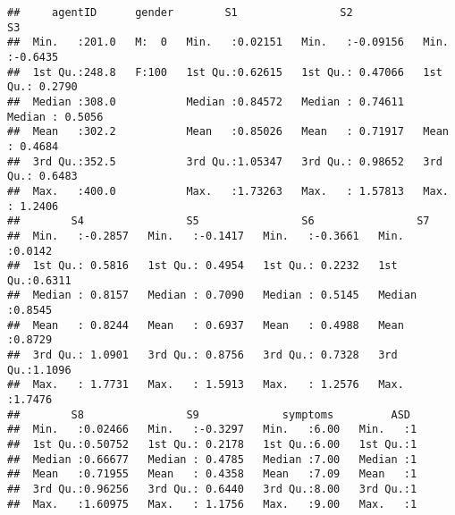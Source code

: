 \documentclass[]{article}
\newenvironment{Shaded}{\begin{snugshade}}{\end{snugshade}}
\newcommand{\KeywordTok}[1]{\textcolor[rgb]{0.13,0.29,0.53}{\textbf{#1}}}
\newcommand{\DecValTok}[1]{\textcolor[rgb]{0.00,0.00,0.81}{#1}}
\newcommand{\StringTok}[1]{\textcolor[rgb]{0.31,0.60,0.02}{#1}}
\newcommand{\CommentTok}[1]{\textcolor[rgb]{0.56,0.35,0.01}{\textit{#1}}}
\newcommand{\OperatorTok}[1]{\textcolor[rgb]{0.81,0.36,0.00}{\textbf{#1}}}
\newcommand{\NormalTok}[1]{#1}
\begin{document}
\begin{verbatim}
##     agentID      gender        S1                S2                 S3         
##  Min.   :201.0   M:  0   Min.   :0.02151   Min.   :-0.09156   Min.   :-0.6435  
##  1st Qu.:248.8   F:100   1st Qu.:0.62615   1st Qu.: 0.47066   1st Qu.: 0.2790  
##  Median :308.0           Median :0.84572   Median : 0.74611   Median : 0.5056  
##  Mean   :302.2           Mean   :0.85026   Mean   : 0.71917   Mean   : 0.4684  
##  3rd Qu.:352.5           3rd Qu.:1.05347   3rd Qu.: 0.98652   3rd Qu.: 0.6483  
##  Max.   :400.0           Max.   :1.73263   Max.   : 1.57813   Max.   : 1.2406  
##        S4                S5                S6                S7        
##  Min.   :-0.2857   Min.   :-0.1417   Min.   :-0.3661   Min.   :0.0142  
##  1st Qu.: 0.5816   1st Qu.: 0.4954   1st Qu.: 0.2232   1st Qu.:0.6311  
##  Median : 0.8157   Median : 0.7090   Median : 0.5145   Median :0.8545  
##  Mean   : 0.8244   Mean   : 0.6937   Mean   : 0.4988   Mean   :0.8729  
##  3rd Qu.: 1.0901   3rd Qu.: 0.8756   3rd Qu.: 0.7328   3rd Qu.:1.1096  
##  Max.   : 1.7731   Max.   : 1.5913   Max.   : 1.2576   Max.   :1.7476  
##        S8                S9             symptoms         ASD   
##  Min.   :0.02466   Min.   :-0.3297   Min.   :6.00   Min.   :1  
##  1st Qu.:0.50752   1st Qu.: 0.2178   1st Qu.:6.00   1st Qu.:1  
##  Median :0.66677   Median : 0.4785   Median :7.00   Median :1  
##  Mean   :0.71955   Mean   : 0.4358   Mean   :7.09   Mean   :1  
##  3rd Qu.:0.96256   3rd Qu.: 0.6440   3rd Qu.:8.00   3rd Qu.:1  
##  Max.   :1.60975   Max.   : 1.1756   Max.   :9.00   Max.   :1
\end{verbatim}

\begin{Shaded}
\end{Shaded}
\end{document}

